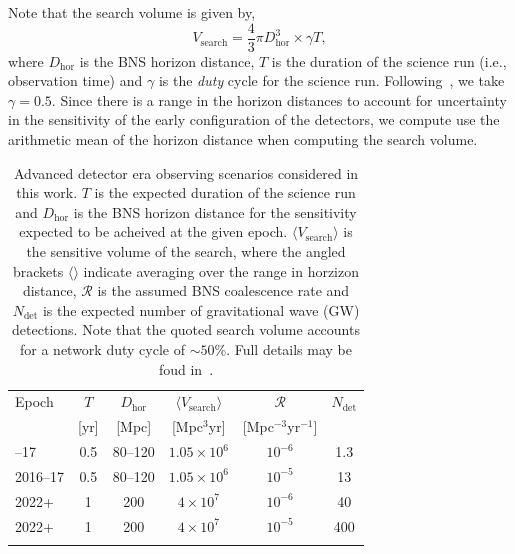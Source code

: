 \documentclass[twocolumn,nofootinbib]{revtex4-1}
\newcommand{\cbcrate}{{{\mathcal R}}}
\def\gw#1{gravitational wave#1 (GW#1)\gdef\gw{GW}}
\begin{document}
Note that the search volume is given by,
\begin{equation}\label{eq:search_volume}
V_{\mathrm{search}} = \frac{4}{3}\pi D_{\mathrm{hor}}^3 \times \gamma T,
\end{equation}
%
where $D_{\mathrm{hor}}$ is the BNS horizon distance, $T$ is the duration of the
science run (i.e., observation time) and $\gamma$ is the \emph{duty} cycle for
the science run.  Following~\cite{ade_prospects}, we take $\gamma=0.5$.  Since
there is a range in the horizon distances to account for uncertainty in the
sensitivity of the early configuration of the detectors, we compute use the
arithmetic mean of the horizon distance when computing the search volume.

\begin{table}
\centering
\begin{tabular}{l c c c c c }
\toprule
Epoch & $T$ & $D_{\mathrm{hor}}$ &
$\langle V_{\mathrm{search}}\rangle$ & $\cbcrate$ & $N_{\mathrm{det}}$ \\
 & [yr] & [Mpc] & [Mpc$^3$yr] &  [Mpc$^{-3}$yr$^{-1}$] \\
\colrule
2016--17 & 0.5 & 80--120 & $1.05\times10^6$ & $10^{-6}$ & 1.3 \\
2016--17 & 0.5 & 80--120 & $1.05\times10^6$ & $10^{-5}$ & 13 \\
2022+ & 1 & 200 & $4\times10^7$ & $10^{-6}$ & 40 \\
2022+ & 1 & 200 & $4\times10^7$ & $10^{-5}$ & 400 \\
\botrule
\end{tabular}
\caption{Advanced detector era observing scenarios considered in this work.  $T$
is the expected duration of the science run and $D_{\mathrm{hor}}$ is the BNS
horizon distance for the sensitivity expected to be acheived at the given epoch.
$\langle V_{\mathrm{search}}\rangle $ is the sensitive volume of the search,
where the angled brackets $\langle \rangle$ indicate averaging over the range
in horzizon distance, $\cbcrate$ is the assumed BNS coalescence rate and
$N_{\mathrm{det}}$ is the expected number of \gw{} detections.  Note that the
quoted search volume accounts for a network duty cycle of $\sim 50\%$.
Full details may be foud in~\cite{ade_prospects}.\label{table:scenarios}}
\end{table}
\end{document}
